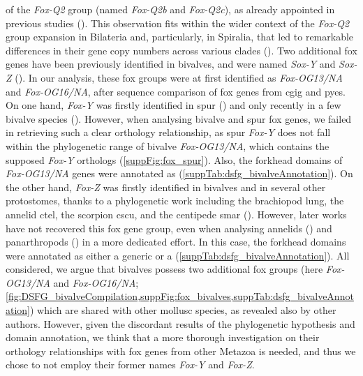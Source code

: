 of the \textit{Fox-Q2} group (named \textit{Fox-Q2b} and \textit{Fox-Q2c}), as already appointed in previous studies (). This observation fits within the wider context of the \textit{Fox-Q2} group expansion in Bilateria and, particularly, in Spiralia, that led to remarkable differences in their gene copy numbers across various clades (). Two additional \gls{fox} genes have been previously identified in bivalves, and were named \textit{Sox-Y} and \textit{Sox-Z} (). In our analysis, these \gls{fox} groups were at first identified as \textit{Fox-OG13/NA} and \textit{Fox-OG16/NA}, after sequence comparison of \gls{fox} genes from \gls{cgig} and \gls{pyes}. On one hand, \textit{Fox-Y} was firstly identified in \gls{spur} () and only recently in a few bivalve species (). However, when analysing bivalve and \gls{spur} \gls{fox} genes, we failed in retrieving such a clear orthology relationship, as \gls{spur} \textit{Fox-Y} does not fall within the phylogenetic range of bivalve \textit{Fox-OG13/NA}, which contains the supposed \textit{Fox-Y} orthologs (\cref{suppFig:fox_spur}). Also, the forkhead domains of \textit{Fox-OG13/NA} genes were annotated as  (\cref{suppTab:dsfg_bivalveAnnotation}). On the other hand, \textit{Fox-Z} was firstly identified in bivalves and in several other protostomes, thanks to a phylogenetic work including the brachiopod \gls{lung}, the annelid \gls{ctel}, the scorpion \gls{cscu}, and the centipede \gls{smar} (). However, later works have not recovered this \gls{fox} gene group, even when analysing annelids () and panarthropods () in a more dedicated effort. In this case, the forkhead domains were annotated as either a generic  or a  (\cref{suppTab:dsfg_bivalveAnnotation}). All considered, we argue that bivalves possess two additional \gls{fox} groups (here \textit{Fox-OG13/NA} and \textit{Fox-OG16/NA}; \cref{fig:DSFG_bivalveCompilation,suppFig:fox_bivalves,suppTab:dsfg_bivalveAnnotation}) which are shared with other mollusc species, as revealed also by other authors. However, given the discordant results of the phylogenetic hypothesis and domain annotation, we think that a more thorough investigation on their orthology relationships with \gls{fox} genes from other Metazoa is needed, and thus we chose to not employ their former names \textit{Fox-Y} and \textit{Fox-Z}.

